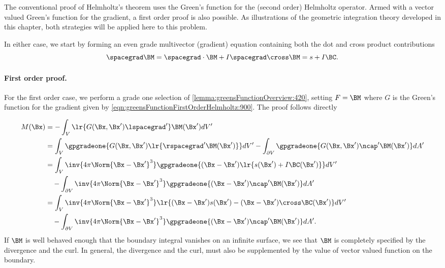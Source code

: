 %
%
The conventional proof of Helmholtz's theorem uses the Green's function for the (second order) Helmholtz operator.
Armed with a vector valued Green's function for the gradient, a first order proof is also possible.
As illustrations of the geometric integration theory developed in this chapter, both
strategies will be applied here to this problem.

In either case, we start by forming an even grade multivector (gradient) equation containing both the dot and cross product contributions
\begin{equation}\label{eqn:helmholtzDerviationMultivectorSolution:60}
\spacegrad \BM
= \spacegrad \cdot \BM + I \spacegrad \cross \BM
= s + I \BC.
\end{equation}

\paragraph{First order proof.}

For the first order case, we
perform a grade one selection of \cref{lemma:greensFunctionOverview:420}, setting
\( F = \BM \) where \( G \) is the Green's function for the gradient given by
\cref{eqn:greensFunctionFirstOrderHelmholtz:900}.  The proof follows directly

\begin{equation}\label{eqn:helmholtzDerviationMultivectorSolution:820}
\begin{aligned}
M(\Bx)
&= - \int_V \lr{ G(\Bx, \Bx') \lspacegrad' } \BM(\Bx') dV' \\
&= \int_V \gpgradeone{G(\Bx, \Bx') \lr{ \rspacegrad' \BM(\Bx') }} dV'
-
\int_{\partial V} \gpgradeone{ G(\Bx, \Bx') \ncap' \BM(\Bx') } dA' \\
&=
\int_V
\inv{4 \pi \Norm{\Bx - \Bx'}^3 }
\gpgradeone{ (\Bx - \Bx') \lr{ s(\Bx') + I \BC(\Bx') }} dV' \\
&\quad -
\int_{\partial V}
\inv{4 \pi \Norm{\Bx - \Bx'}^3 }
\gpgradeone{ (\Bx - \Bx') \ncap' \BM(\Bx') } dA' \\
&=
\int_V
\inv{4 \pi \Norm{\Bx - \Bx'}^3 }
\lr{ (\Bx - \Bx') s(\Bx') - (\Bx - \Bx') \cross \BC(\Bx') } dV' \\
&\quad -
\int_{\partial V}
\inv{4 \pi \Norm{\Bx - \Bx'}^3 }
\gpgradeone{ (\Bx - \Bx') \ncap' \BM(\Bx') } dA'.
\end{aligned}
\end{equation}
If \( \BM \) is well behaved enough that the boundary integral vanishes on an infinite surface, we see that \( \BM \) is completely specified by the divergence and the curl.
In general, the divergence and the curl, must also be supplemented by the value of vector valued function on the boundary.

